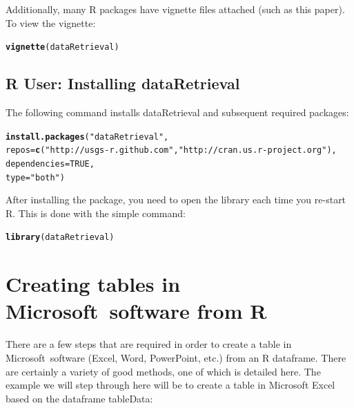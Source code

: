 \documentclass[a4paper,11pt]{article}\usepackage[]{graphicx}\usepackage[]{color}
\makeatletter
\newcommand{\hlnum}[1]{\textcolor[rgb]{0.686,0.059,0.569}{#1}}%
\newcommand{\hlstr}[1]{\textcolor[rgb]{0.192,0.494,0.8}{#1}}%
\newcommand{\hlstd}[1]{\textcolor[rgb]{0.345,0.345,0.345}{#1}}%
\newcommand{\hlkwc}[1]{\textcolor[rgb]{0.333,0.667,0.333}{#1}}%
\newcommand{\hlkwd}[1]{\textcolor[rgb]{0.737,0.353,0.396}{\textbf{#1}}}%
\newenvironment{kframe}{%
 \def\at@end@of@kframe{}%
 \ifinner\ifhmode%
  \def\at@end@of@kframe{\end{minipage}}%
  \begin{minipage}{\columnwidth}%
 \fi\fi%
 \def\FrameCommand##1{\hskip\@totalleftmargin \hskip-\fboxsep
 \colorbox{shadecolor}{##1}\hskip-\fboxsep
     \hskip-\linewidth \hskip-\@totalleftmargin \hskip\columnwidth}%
 \MakeFramed {\advance\hsize-\width
   \@totalleftmargin\z@ \linewidth\hsize
   \@setminipage}}%
 {\par\unskip\endMakeFramed%
 \at@end@of@kframe}
\newenvironment{knitrout}{}{} %
\makeatother
\begin{document}
Additionally, many R packages have vignette files attached (such as this paper). To view the vignette:
\begin{knitrout}
\color{fgcolor}\begin{kframe}
\begin{alltt}
\hlkwd{vignette}\hlstd{(dataRetrieval)}
\end{alltt}
\end{kframe}
\end{knitrout}

\FloatBarrier
\clearpage
\subsection{R User: Installing dataRetrieval}
The following command installs dataRetrieval and subsequent required packages:

\begin{knitrout}
\color{fgcolor}\begin{kframe}
\begin{alltt}
\hlkwd{install.packages}\hlstd{(}\hlstr{"dataRetrieval"}\hlstd{,}
\hlkwc{repos}\hlstd{=}\hlkwd{c}\hlstd{(}\hlstr{"http://usgs-r.github.com"}\hlstd{,}\hlstr{"http://cran.us.r-project.org"}\hlstd{),}
\hlkwc{dependencies}\hlstd{=}\hlnum{TRUE}\hlstd{,}
\hlkwc{type}\hlstd{=}\hlstr{"both"}\hlstd{)}
\end{alltt}
\end{kframe}
\end{knitrout}

After installing the package, you need to open the library each time you re-start R.  This is done with the simple command:
\begin{knitrout}
\color{fgcolor}\begin{kframe}
\begin{alltt}
\hlkwd{library}\hlstd{(dataRetrieval)}
\end{alltt}
\end{kframe}
\end{knitrout}


\section{Creating tables in Microsoft\textregistered\ software from R}
\label{app:createWordTable}
There are a few steps that are required in order to create a table in Microsoft\textregistered\ software (Excel, Word, PowerPoint, etc.) from an R dataframe. There are certainly a variety of good methods, one of which is detailed here. The example we will step through here will be to create a table in Microsoft Excel based on the dataframe tableData:
\end{document}
